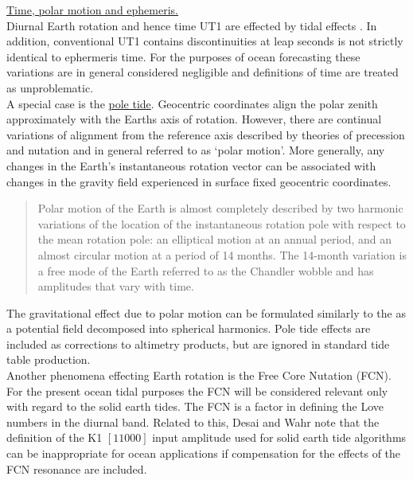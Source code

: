 \underline{Time, polar motion and ephemeris.}\\ 
Diurnal Earth rotation and hence time UT1 are effected by tidal effects \citep[sec 8]{Anonymous:2004tm}.  In addition, conventional UT1 contains discontinuities at leap seconds is not strictly identical to ephermeris time.  For the purposes of ocean forecasting these variations are in general considered negligible and definitions of time are treated as unproblematic.\\




A special case is the \underline{pole tide}. Geocentric coordinates align the polar zenith approximately with the Earths axis of rotation. However, there are continual variations of alignment from the reference axis described by theories of precession and nutation and in general referred to as `polar motion'.   More generally, any changes in the Earth's instantaneous rotation vector can be associated with changes in the gravity field  experienced in surface fixed geocentric coordinates.\\
\begin{quotation}
Polar motion of the Earth is almost completely described by two harmonic variations of the location of the instantaneous rotation pole with respect to the mean rotation pole: an elliptical motion at an annual period, and an almost circular motion at a period of 14 months. The 14-month variation is a free mode of the Earth referred to as the Chandler wobble and has amplitudes that vary with time. \citep{Desai:2002ev}
\end{quotation}
The gravitational effect due to polar motion can be formulated similarly to the \ATGF{} as a potential field decomposed into spherical harmonics.
Pole tide effects are included as corrections to altimetry products, but are ignored in standard tide table production.\\
Another phenomena effecting Earth rotation is the Free Core Nutation (FCN).  For the present ocean tidal purposes the FCN will be considered relevant only with regard to the solid earth tides.  The FCN is a factor in defining the  Love numbers in the diurnal band.   Related to this, Desai and Wahr note that the definition of the K1 $[1 1 0 0 0]$ input amplitude used for solid earth tide algorithms can be inappropriate for ocean applications if compensation for the effects of the FCN resonance are included\cite{Desai:1995je}.




